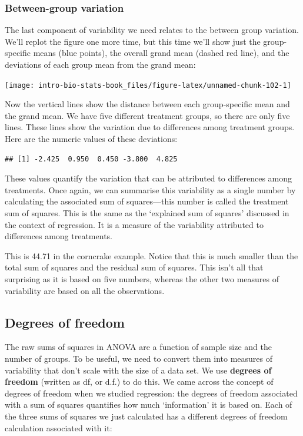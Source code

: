 \documentclass[
]{book}
\begin{document}
\hypertarget{between-group-variation}{%
\subsubsection*{Between-group variation}\label{between-group-variation}}

The last component of variability we need relates to the between group variation. We'll replot the figure one more time, but this time we'll show just the group-specific means (blue points), the overall grand mean (dashed red line), and the deviations of each group mean from the grand mean:

\begin{center}\texttt{[image: intro-bio-stats-book\_files/figure-latex/unnamed-chunk-102-1]} \end{center}

Now the vertical lines show the distance between each group-specific mean and the grand mean. We have five different treatment groups, so there are only five lines. These lines show the variation due to differences among treatment groups. Here are the numeric values of these deviations:

\begin{verbatim}
## [1] -2.425  0.950  0.450 -3.800  4.825
\end{verbatim}

These values quantify the variation that can be attributed to differences among treatments. Once again, we can summarise this variability as a single number by calculating the associated sum of squares---this number is called the treatment sum of squares. This is the same as the `explained sum of squares' discussed in the context of regression. It is a measure of the variability attributed to differences among treatments.

This is 44.71 in the corncrake example. Notice that this is much smaller than the total sum of squares and the residual sum of squares. This isn't all that surprising as it is based on five numbers, whereas the other two measures of variability are based on all the observations.

\hypertarget{degrees-of-freedom}{%
\subsection{Degrees of freedom}\label{degrees-of-freedom}}

The raw sums of squares in ANOVA are a function of sample size and the number of groups. To be useful, we need to convert them into measures of variability that don't scale with the size of a data set. We use \textbf{degrees of freedom} (written as df, or d.f.) to do this. We came across the concept of degrees of freedom when we studied regression: the degrees of freedom associated with a sum of squares quantifies how much `information' it is based on. Each of the three sums of squares we just calculated has a different degrees of freedom calculation associated with it:
\end{document}
